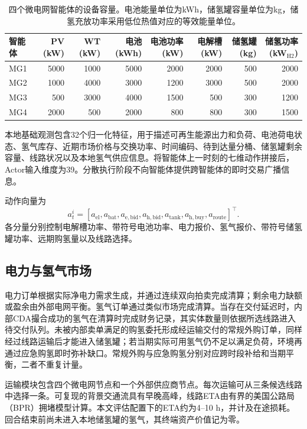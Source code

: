 \documentclass[final,5p,times]{elsarticle}
\begin{document}
\begin{table}[t]
\centering
\caption{四个微电网智能体的设备容量。电池能量单位为kWh，储氢罐容量单位为kg，储氢充放功率采用低位热值对应的等效能量单位。}
\label{tab:assets}
\small
\begin{tabular}{lrrrrrrr}
\toprule
智能体 & PV (kW) & WT (kW) & 电池 (kWh) & 电池功率 (kW) & 电解槽 (kW) & 储氢罐 (kg) & 储氢功率 (kW$_{\mathrm{H2}}$)\\
\midrule
MG1 & 5000 & 1000 & 5000 & 2000 & 2000 & 500 & 2000\\
MG2 & 1000 & 4000 & 3000 & 1200 & 3000 & 500 & 2000\\
MG3 &  500 & 3000 & 4000 & 1500 &  500 & 300 & 1200\\
MG4 & 2000 &  500 & 2000 &  800 &  800 & 300 & 1500\\
\bottomrule
\end{tabular}
\end{table}

本地基础观测包含32个归一化特征，用于描述可再生能源出力和负荷、电池荷电状态、氢气库存、近期市场价格与交换功率、时间编码、待到达量分桶、储氢罐剩余容量、线路状况以及本地氢气供应信息。将智能体上一时刻的七维动作拼接后，Actor输入维度为39。分散执行阶段不向智能体提供跨智能体的即时交易广播信息。

动作向量为
\begin{equation}
 a_t^i=[a_{\mathrm{el}},a_{\mathrm{bat}},a_{\mathrm{e,bid}},a_{\mathrm{h,bid}},
 a_{\mathrm{tank}},a_{\mathrm{h,buy}},a_{\mathrm{route}}]^{\top}.
\end{equation}
各分量分别控制电解槽功率、带符号电池功率、电力报价、氢气报价、带符号储氢罐功率、远期购氢量以及线路选择。

\subsection{电力与氢气市场}

电力订单根据实际净电力需求生成，并通过连续双向拍卖完成清算；剩余电力缺额或盈余由外部电网平衡。氢气订单通过类似市场完成清算。当存在交付延迟时，内部CDA撮合成功的氢气在清算时完成财务记录，其实体数量则依据所选线路进入待交付队列。未被内部卖单满足的购氢委托形成经运输交付的常规外购订单，同样经过线路运输后才能进入储氢罐；若当期实际可用氢气仍不足以满足负荷，环境再通过应急购氢即时弥补缺口。常规外购与应急购氢分别对应跨时段补给和当期平衡，二者不重复计量。

运输模块包含四个微电网节点和一个外部供应商节点。每次运输可从三条候选线路中选择一条。可复现的背景交通流具有早晚高峰，线路ETA由有界的美国公路局（BPR）拥堵模型计算。本文评估配置下的ETA约为4--10 h，并计及在途损耗。回合结束前尚未进入本地储氢罐的氢气，其终端资产价值记为零。
\end{document}
